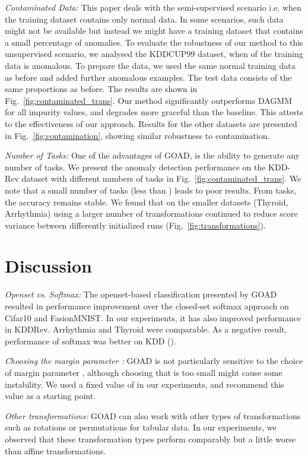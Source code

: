 \documentclass{article} \usepackage{iclr2020_conference,times}
\begin{document}
\textit{Contaminated Data:} This paper deals with the semi-supervised scenario i.e. when the training dataset contains only normal data. In some scenarios, such data might not be available but instead we might have a training dataset that contains a small percentage of anomalies. To evaluate the robustness of our method to this unsupervised scenario, we analysed the KDDCUP99 dataset, when  of the training data is anomalous.  To prepare the data, we used the same normal training data as before and added further anomalous examples. The test data consists of the same proportions as before. The results are shown in Fig.~\ref{fig:contaminated_trans}. Our method significantly outperforms DAGMM for all impurity values, and degrades more graceful than the baseline. This attests to the effectiveness of our approach. Results for the other datasets are presented in Fig.~\ref{fig:contamination}, showing similar robustness to contamination.

\textit{Number of Tasks:} One of the advantages of GOAD, is the ability to generate any number of tasks. We present the anomaly detection performance on the KDD-Rev dataset with different numbers of tasks in Fig.~\ref{fig:contaminated_trans}. We note that a small number of tasks (less than ) leads to poor results. From  tasks, the accuracy remains stable. We found that on the smaller datasets (Thyroid, Arrhythmia) using a larger number of transformations continued to reduce  score variance between differently initialized runs (Fig.~\ref{fig:transformations}).

\section{Discussion}
\label{sec:disc}

\textit{Openset vs. Softmax:} The openset-based classification presented by GOAD resulted in performance improvement over the closed-set softmax approach on Cifar10 and FasionMNIST. In our experiments, it has also improved performance in KDDRev. Arrhythmia and Thyroid were comparable. As a negative result, performance of softmax was better on KDD ().

\textit{Choosing the margin parameter :} GOAD is not particularly sensitive to the choice of margin parameter , although choosing  that is too small might cause some instability. We used a fixed value of  in our experiments, and recommend this value as a starting point.

\textit{Other transformations:} GOAD can also work with other types of transformations such as rotations or permutations for tabular data. In our experiments, we observed that these transformation types perform comparably but a little worse than affine transformations.
\end{document}
